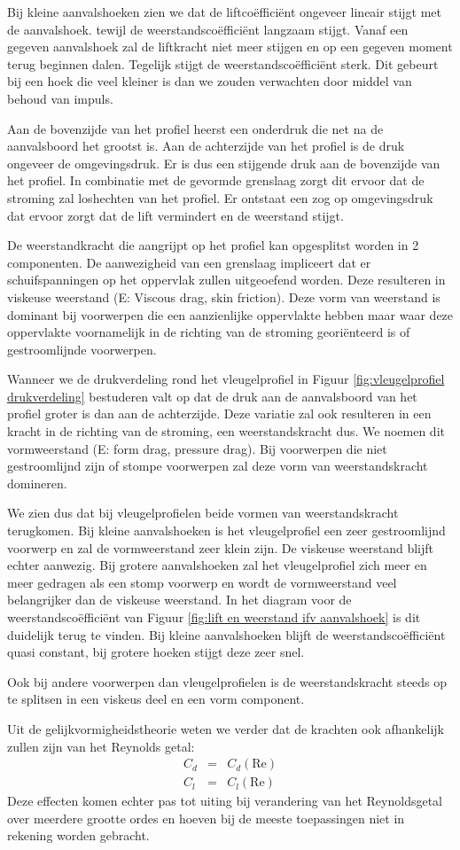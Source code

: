 Bij kleine aanvalshoeken zien we dat de liftcoëfficiënt ongeveer lineair stijgt met de aanvalshoek. tewijl de weerstandscoëfficiënt langzaam stijgt. Vanaf een gegeven aanvalshoek zal de liftkracht niet meer stijgen en op een gegeven moment terug beginnen dalen. Tegelijk stijgt de weerstandscoëfficiënt sterk. Dit gebeurt bij een hoek die veel kleiner is dan we zouden verwachten door middel van behoud van impuls.

Aan de bovenzijde van het profiel heerst een onderdruk die net na de aanvalsboord het grootst is. Aan de achterzijde van het profiel is de druk ongeveer de omgevingsdruk. Er is dus een stijgende druk aan de bovenzijde van het profiel. In combinatie met de gevormde grenslaag zorgt dit ervoor dat de stroming zal loshechten van het profiel. Er ontstaat een zog op omgevingsdruk dat ervoor zorgt dat de lift vermindert en de weerstand stijgt.

De weerstandkracht die aangrijpt op het profiel kan opgesplitst worden in 2 componenten. De aanwezigheid van een grenslaag impliceert dat er schuifspanningen op het oppervlak zullen uitgeoefend worden. Deze resulteren in viskeuse weerstand (E: Viscous drag, skin friction). Deze vorm van weerstand is dominant bij voorwerpen die een aanzienlijke oppervlakte hebben maar waar deze oppervlakte voornamelijk in de richting van de stroming georiënteerd is of gestroomlijnde voorwerpen.

Wanneer we de drukverdeling rond het vleugelprofiel in Figuur \ref{fig:vleugelprofiel drukverdeling} bestuderen valt op dat de druk aan de aanvalsboord van het profiel groter is dan aan de achterzijde. Deze variatie zal ook resulteren in een kracht in de richting van de stroming, een weerstandskracht dus. We noemen dit vormweerstand (E: form drag, pressure drag). Bij voorwerpen die niet gestroomlijnd zijn of stompe voorwerpen zal deze vorm van weerstandskracht domineren.

We zien dus dat bij vleugelprofielen beide vormen van weerstandskracht terugkomen. Bij kleine aanvalshoeken is het vleugelprofiel een zeer gestroomlijnd voorwerp en zal de vormweerstand zeer klein zijn. De viskeuse weerstand blijft echter aanwezig. Bij grotere aanvalshoeken zal het vleugelprofiel zich meer en meer gedragen als een stomp voorwerp en wordt de vormweerstand veel belangrijker dan de viskeuse weerstand. In het diagram voor de weerstandscoëfficiënt van Figuur \ref{fig:lift en weerstand ifv aanvalshoek} is dit duidelijk terug te vinden. Bij kleine aanvalshoeken blijft de weerstandscoëfficiënt quasi constant, bij grotere hoeken stijgt deze zeer snel.

Ook bij andere voorwerpen dan vleugelprofielen is de weerstandskracht steeds op te splitsen in een viskeus deel en een vorm component.

Uit de gelijkvormigheidstheorie weten we verder dat de krachten ook afhankelijk zullen zijn van het Reynolds getal: 
\begin{eqnarray}
	C_d &=& C_d(\text{Re}) \\
	C_l &=& C_l(\text{Re})
\end{eqnarray}
Deze effecten komen echter pas tot uiting bij verandering van het Reynoldsgetal over meerdere grootte ordes en hoeven bij de meeste toepassingen niet in rekening worden gebracht.
